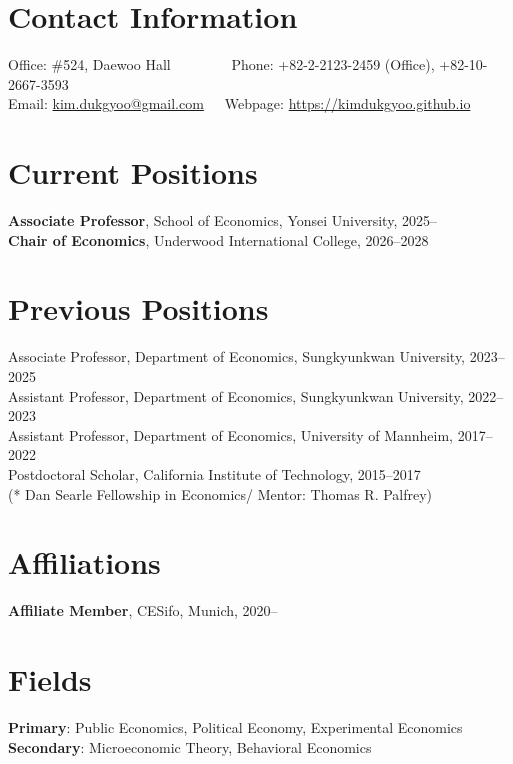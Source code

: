 \documentclass[margin, a4paper]{res}
\begin{document}
 

\begin{resume} 
\section{Contact Information} Office: \#524, Daewoo Hall$\qquad\qquad$ Phone: +82-2-2123-2459 (Office), +82-10-2667-3593\\
Email: \href{mailto:kim.dukgyoo@gmail.com}{kim.dukgyoo@gmail.com}$\quad\,$ Webpage: \url{https://kimdukgyoo.github.io}

\section{Current Positions}
\textbf{Associate Professor}, School of Economics, Yonsei University, 2025--\\
\textbf{Chair of Economics}, Underwood International College, 2026--2028

\section{Previous Positions}
{Associate Professor}, Department of Economics, Sungkyunkwan University, 2023--2025\\
{Assistant Professor}, Department of Economics, Sungkyunkwan University, 2022--2023\\
{Assistant Professor}, Department of Economics, University of Mannheim, 2017--2022\\
{Postdoctoral Scholar}, California Institute of Technology, 2015--2017\\
(* Dan Searle Fellowship in Economics/ Mentor: Thomas R. Palfrey)

\section{Affiliations}
\textbf{Affiliate Member}, CESifo, Munich, 2020--

\section{Fields}
\textbf{Primary}: Public Economics, Political Economy, Experimental Economics\\
\textbf{Secondary}: Microeconomic Theory, Behavioral Economics


\end{resume}
\end{document}
